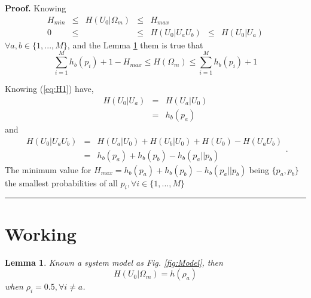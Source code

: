 \documentclass[a4paper,10pt]{article}
\newtheorem{mylemma}[mytheorem]{Lemma}
\newenvironment{myproof}[1][Proof]{\textbf{#1.} }{\ \rule{0.5em}{0.5em}}
\begin{document}
\begin{myproof}
 \label{proof:Hin}
 Knowing 
\begin{equation}\label{eq:Hin1}
\begin{matrix}
 H_{min} & \leq & H(U_0|\Omega_m) & \leq & H_{max}       & ~    & ~\\
 0       & \leq & ~               & \leq & H(U_0|U_aU_b) & \leq &H(U_0|U_a)
\end{matrix}
\end{equation}
$\forall a,b \in \{1, ..., M\}$, and the Lemma \ref{lemm:H} them is true that
\begin{equation}\label{eq:Hin2}
 \sum_{i=1}^{M}{h_b(p_i)}+1 -H_{max} \leq H(\Omega_m) \leq \sum_{i=1}^{M}{h_b(p_i)}+1
\end{equation}

 Knowing (\ref{eq:H1}) have,  
 \begin{equation}\label{eq:Hin4}
\begin{matrix}
 H(U_0|U_a)&=&H(U_a|U_0)\\
       ~  &=&h_b(p_a)
\end{matrix}
\end{equation}
and 
\begin{equation}\label{eq:Hin5}
\begin{matrix}
H(U_0|U_aU_b) & = & H(U_a|U_0) + H(U_b|U_0) + H(U_0)- H(U_aU_b)  \\
 ~            & = & h_b(p_a) + h_b(p_b) - h_b(p_a||p_b)
 \end{matrix}.
\end{equation}
The minimum value for $H_{max}=h_b(p_a) + h_b(p_b) - h_b(p_a||p_b)$ being 
$\{p_a,p_b\}$ the smallest probabilities of all $p_i, \forall i \in \{1, ..., M\}$ 
\end{myproof}
\section{Working}
\label{sec:working}

\begin{mdframed}[style=MDFStyGrayScreen]
\begin{mylemma}
 \label{lemm:H}
 Known a system model as Fig. \ref{fig:Model}, then
\begin{equation}\label{eq:Hccc2}
H(U_0|\Omega_m) = h(\rho_a)
\end{equation}
when $\rho_i=0.5, \forall i \neq a$.
\end{mylemma}
\end{mdframed}
\end{document}
